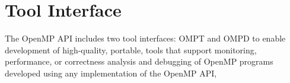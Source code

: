 %
%
%
%
%
%
%
%
%
%
%
%
%

\section{Tool Interface}
\label{subsec:Tool Support}

The OpenMP API includes two tool interfaces: OMPT and OMPD
to enable development of high-quality, portable, tools that support
monitoring, performance, or correctness analysis and debugging of OpenMP programs
developed using any implementation of the OpenMP API,


